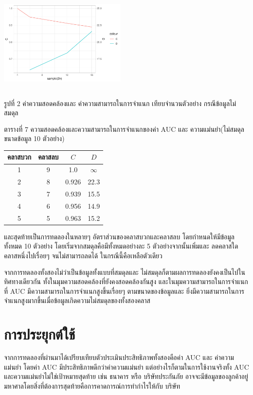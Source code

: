\documentclass[twoside, twocolumn, 12pt]{article}
\begin{document}
\includegraphics[height=2in,width=2.5in]{pic/Rplot02.pdf}
\begin{center} รูปที่ 2 ค่าความสอดคล้องและ ค่าความสามารถในการจำแนก เทียบจำนวนตัวอย่าง กรณีข้อมูลไม่สมดุล\end{center}
\begin{center} ตารางที่ 7 ความสอดคล้องและความสามารถในการจำแนกของค่า AUC และ ความแม่นยำ(ไม่สมดุล ขนาดข้อมูล 10 ตัวอย่าง) \end{center}
\begin{center}
\begin{tabular}{cccc}
\hline
คลาสบวก & คลาสลบ & $C$ & $D$\\
\hline
1&9&1.0 &$\infty$\\\hline
2&8&0.926&22.3\\\hline
3&7&0.939&15.5\\\hline
4&6&0.956&14.9\\\hline
5&5&0.963&15.2\\\hline
\end{tabular}
\end{center}

และสุดท้ายเป็นการทดลองในหลายๆ อัตราส่วนของคลาสบวกและคลาสลบ โดยกำหนดให้มีข้อมูลทั้งหมด 10 ตัวอย่าง โดยเริ่มจากสมดุลคือมีทั้งหมดอย่างละ 5 ตัวอย่างจากนั้นเพิ่มและ ลดคลาสใดคลาสหนึ่งไปเรื่อยๆ จนไม่สามารถลดได้ ในกรณีนี้คือเหลือตัวเดียว

จากการทดลองทั้งสองไม่ว่าเป็นข้อมูลทั้งแบบที่สมดุลและ ไม่สมดุลก็ตามผลการทดลองยังคงเป็นไปในทิศทางเดียวกัน ทั้งในมุมความสอดคล้องที่ยังคงสอดคล้องกันสูง และในมุมความสามารถในการจำแนกที่ AUC มีความสามารถในการจำแนกสูงขึ้นเรื่อยๆ ตามขนาดของข้อมูลและ ยิ่งมีความสามารถในการจำแนกสูงมากขึ้นเมื่อข้อมูลเกิดความไม่สมดุลของทั้งสองคลาส


\section{การประยุกต์ใช้}
\quad จากการทดลองที่ผ่านมาได้เปรียบเทียบตัวประเมินประสิทธิภาพทั้งสองคือค่า AUC และ ค่าความแม่นยำ โดยค่า AUC มีประสิทธิภาพดีกว่าค่าความแม่นยำ แต่อย่างไรก็ตามในการใช้งานจริงทั้ง AUC และความแม่นยำไม่ใช่เป้าหมายสุดท้าย เช่น  ธนาคาร หรือ บริษัทประกันภัย อาจจะมีข้อมูลของลูกค้าอยู่มหาศาลโดยสิ่งที่ต้องการสุดท้ายคือการคาดการณ์การทำกำไรให้กับ บริษัท
\end{document}
